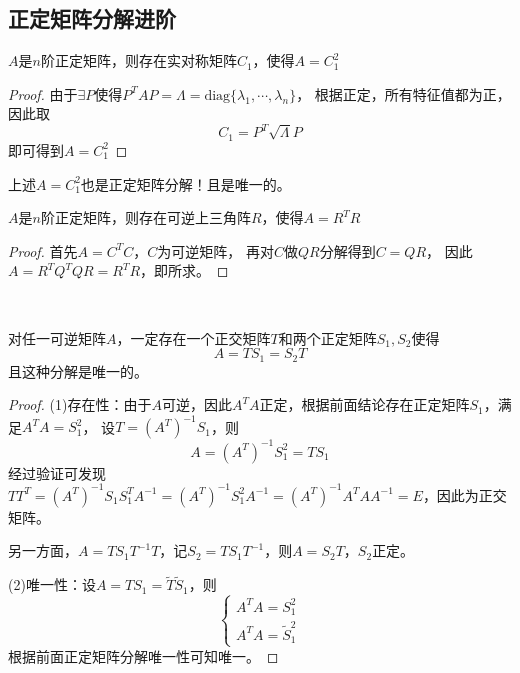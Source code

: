 \subsection{正定矩阵分解进阶}

\begin{theorem}[正定矩阵平方分解]
$A$是$n$阶正定矩阵，则存在实对称矩阵$C_1$，使得$A = C_1^2$
\end{theorem}

\begin{proof}
  由于$\exists P$使得$P^TAP = \Lambda =  \mathrm{diag}\{\lambda_1,\cdots,\lambda_n\}$，
  根据正定，所有特征值都为正，因此取
  \begin{equation*}
    C_1 = P^T \sqrt{\Lambda} P
  \end{equation*}
  即可得到$A = C_1^2$
\end{proof}

\begin{note}
  上述$A = C_1^2$也是正定矩阵分解！且是唯一的。
\end{note}

\begin{theorem}[正定矩阵三角分解]
  $A$是$n$阶正定矩阵，则存在可逆上三角阵$R$，使得$A = R^TR$
\end{theorem}

\begin{proof}
  首先$A = C^TC$，$C$为可逆矩阵，
  再对$C$做$QR$分解得到$C = QR$，
  因此$A = R^TQ^TQR = R^TR$，即所求。
\end{proof}

~

\begin{theorem}[极分解定理]
  对任一可逆矩阵$A$，一定存在一个正交矩阵$T$和两个正定矩阵$S_1,S_2$使得
  \begin{equation*}
    A = TS_1 = S_2T
  \end{equation*}
  且这种分解是唯一的。
\end{theorem}

\begin{proof}
  (1)存在性：由于$A$可逆，因此$A^TA$正定，根据前面结论存在正定矩阵$S_1$，满足$A^TA = S_1^2$，
  设$T = (A^T)^{-1}S_1$，则
  \begin{equation*}
    A = (A^T)^{-1}S_1^2 = TS_1
  \end{equation*}
  经过验证可发现$TT^T = (A^T)^{-1}S_1S_1^TA^{-1} = (A^T)^{-1}S_1^2A^{-1} = (A^T)^{-1}A^TAA^{-1} = E$，因此为正交矩阵。

  另一方面，$A = TS_1T^{-1}T$，记$S_2 = TS_1T^{-1}$，则$A = S_2T$，$S_2$正定。

  (2)唯一性：设$A = TS_1 = \tilde{T}\tilde{S}_1$，则
  \begin{equation*}
    \begin{cases}
      A^TA = S_1^2\\
      A^TA = \tilde{S}_1^2
    \end{cases}
  \end{equation*}
  根据前面正定矩阵分解唯一性可知唯一。
\end{proof}


